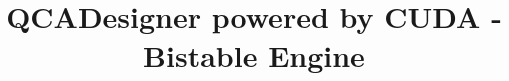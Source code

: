 \documentclass[a4paper,12pt]{report}
\begin{document}
\title{QCADesigner powered by CUDA - Bistable Engine}

\providecommand{\primoautore}{Gibilisco~\sc{Giovanni Paolo}}               
\providecommand{\primamatricola}{755066}            
\providecommand{\secondoautore}{Marconi~\sc{Francesco}}
\providecommand{\secondamatricola}{755439}
\providecommand{\terzoautore}{Miglierina~\sc{Marco}}
\providecommand{\terzamatricola}{754848}
\providecommand{\instructor}{Prof.ssa Sciuto~\sc{Donatella}}  
\providecommand{\tutor}{Redaelli~\sc{Francesco}, Cancar\'e~\sc{Fabio}}
\providecommand{\annoacc}{2009-2010}

\titlfp

\titlepage

\headsep 2cm

\setlength{\headwidth}{\textwidth}
  \fancyhead[R]{}


	\fancyfoot[C]{\thepage}
	\renewcommand{\footrulewidth}{0.4pt}

\newpage

\tableofcontents

\newpage

\listoffigures




\newpage


\newpage


\newpage


\newpage



\newpage



\newpage



\newpage




\end{document}
